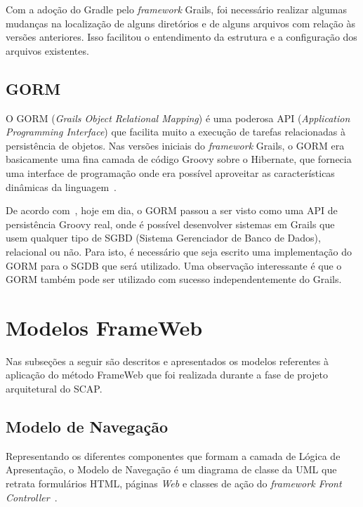 Com a adoção do Gradle pelo \textit{framework} Grails, foi necessário realizar algumas mudanças na localização de alguns diretórios e de alguns arquivos com relação às versões anteriores. Isso facilitou o entendimento da estrutura e a configuração dos arquivos existentes.

\subsection{GORM}
\label{sec-projeto-gorm}

O GORM (\textit{Grails Object Relational Mapping}) é uma poderosa API (\textit{Application Programming Interface}) que facilita muito a execução de tarefas relacionadas à persistência de objetos. Nas versões iniciais do \textit{framework} Grails, o GORM era basicamente uma fina camada de código Groovy sobre o Hibernate, que fornecia uma interface de programação onde era possível aproveitar as características dinâmicas da linguagem~\cite{weissmann:fgapdw15}.

De acordo com~, hoje em dia, o GORM passou a ser visto como uma API de persistência Groovy real, onde é possível desenvolver sistemas em Grails que usem qualquer tipo de SGBD (Sistema Gerenciador de Banco de Dados), relacional ou não. Para isto, é necessário que seja escrito uma implementação do GORM para o SGDB que será utilizado. Uma observação interessante é que o GORM também pode ser utilizado com sucesso independentemente do Grails.  

\section{Modelos FrameWeb}
\label{sec-projeto-modelos-frameweb}

Nas subseções a seguir são descritos e apresentados os modelos referentes à aplicação do método FrameWeb que foi realizada durante a fase de projeto arquitetural do SCAP.

\subsection{Modelo de Navegação}
\label{sec-projeto-modelo-navegacao}

Representando os diferentes componentes que formam a camada de Lógica de Apresentação, o Modelo de Navegação é um diagrama de classe da UML que retrata formulários HTML, páginas \textit{Web} e classes de ação do \textit{framework Front Controller}~\cite{souza:masterthesis07}. 

